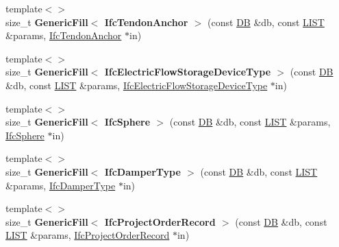 \begin{DoxyCompactItemize}
\item 
\hypertarget{namespace_assimp_1_1_s_t_e_p_acbf5062df1bd3cd45879334d39c31edd}{{\footnotesize template$<$$>$ }\\size\+\_\+t {\bfseries Generic\+Fill$<$ Ifc\+Tendon\+Anchor $>$} (const \hyperlink{class_assimp_1_1_s_t_e_p_1_1_d_b}{D\+B} \&db, const \hyperlink{class_assimp_1_1_s_t_e_p_1_1_e_x_p_r_e_s_s_1_1_l_i_s_t}{L\+I\+S\+T} \&params, \hyperlink{struct_assimp_1_1_i_f_c_1_1_ifc_tendon_anchor}{Ifc\+Tendon\+Anchor} $\ast$in)}\label{namespace_assimp_1_1_s_t_e_p_acbf5062df1bd3cd45879334d39c31edd}

\item 
\hypertarget{namespace_assimp_1_1_s_t_e_p_afb26063d98787c556b272e7c0366a47b}{{\footnotesize template$<$$>$ }\\size\+\_\+t {\bfseries Generic\+Fill$<$ Ifc\+Electric\+Flow\+Storage\+Device\+Type $>$} (const \hyperlink{class_assimp_1_1_s_t_e_p_1_1_d_b}{D\+B} \&db, const \hyperlink{class_assimp_1_1_s_t_e_p_1_1_e_x_p_r_e_s_s_1_1_l_i_s_t}{L\+I\+S\+T} \&params, \hyperlink{struct_assimp_1_1_i_f_c_1_1_ifc_electric_flow_storage_device_type}{Ifc\+Electric\+Flow\+Storage\+Device\+Type} $\ast$in)}\label{namespace_assimp_1_1_s_t_e_p_afb26063d98787c556b272e7c0366a47b}

\item 
\hypertarget{namespace_assimp_1_1_s_t_e_p_ad75ab333a822417b17ce881b8736a74f}{{\footnotesize template$<$$>$ }\\size\+\_\+t {\bfseries Generic\+Fill$<$ Ifc\+Sphere $>$} (const \hyperlink{class_assimp_1_1_s_t_e_p_1_1_d_b}{D\+B} \&db, const \hyperlink{class_assimp_1_1_s_t_e_p_1_1_e_x_p_r_e_s_s_1_1_l_i_s_t}{L\+I\+S\+T} \&params, \hyperlink{struct_assimp_1_1_i_f_c_1_1_ifc_sphere}{Ifc\+Sphere} $\ast$in)}\label{namespace_assimp_1_1_s_t_e_p_ad75ab333a822417b17ce881b8736a74f}

\item 
\hypertarget{namespace_assimp_1_1_s_t_e_p_ad409f7b8155bba9386dedd823961993d}{{\footnotesize template$<$$>$ }\\size\+\_\+t {\bfseries Generic\+Fill$<$ Ifc\+Damper\+Type $>$} (const \hyperlink{class_assimp_1_1_s_t_e_p_1_1_d_b}{D\+B} \&db, const \hyperlink{class_assimp_1_1_s_t_e_p_1_1_e_x_p_r_e_s_s_1_1_l_i_s_t}{L\+I\+S\+T} \&params, \hyperlink{struct_assimp_1_1_i_f_c_1_1_ifc_damper_type}{Ifc\+Damper\+Type} $\ast$in)}\label{namespace_assimp_1_1_s_t_e_p_ad409f7b8155bba9386dedd823961993d}

\item 
\hypertarget{namespace_assimp_1_1_s_t_e_p_a7541a54b077da02f1af367ba044a7e40}{{\footnotesize template$<$$>$ }\\size\+\_\+t {\bfseries Generic\+Fill$<$ Ifc\+Project\+Order\+Record $>$} (const \hyperlink{class_assimp_1_1_s_t_e_p_1_1_d_b}{D\+B} \&db, const \hyperlink{class_assimp_1_1_s_t_e_p_1_1_e_x_p_r_e_s_s_1_1_l_i_s_t}{L\+I\+S\+T} \&params, \hyperlink{struct_assimp_1_1_i_f_c_1_1_ifc_project_order_record}{Ifc\+Project\+Order\+Record} $\ast$in)}\label{namespace_assimp_1_1_s_t_e_p_a7541a54b077da02f1af367ba044a7e40}


\end{DoxyCompactItemize}
